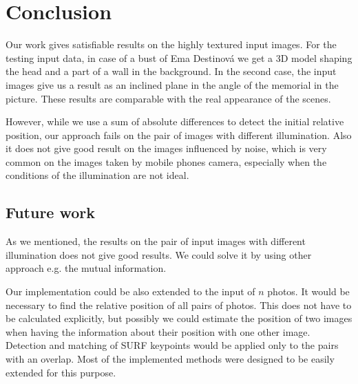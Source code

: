 \chapter*{Conclusion}

Our work gives satisfiable results on the highly textured input images.
For the testing input data, in case of a bust of Ema Destinová we get a 3D model shaping the head and a part of a wall in the background.
In the second case, the input images give us a result as an inclined plane in the angle of the memorial in the picture.
These results are comparable with the real appearance of the scenes.

However, while we use a sum of absolute differences to detect the initial relative position, our approach fails on the pair of images with different illumination.
Also it does not give good result on the images influenced by noise, which is very common on the images taken by mobile phones camera, 
especially when the conditions of the illumination are not ideal.


\section{Future work}
As we mentioned, the results on the pair of input images with different illumination does not give good results.
We could solve it by using other approach e.g. the mutual information.

Our implementation could be also extended to the input of $n$ photos. 
It would be necessary to find the relative position of all pairs of photos.
This does not have to be calculated explicitly, but possibly we could estimate the position of two images when having the information about their position with one other image.
Detection and matching of SURF keypoints would be applied only to the pairs with an overlap.
Most of the implemented methods were designed to be easily extended for this purpose.
